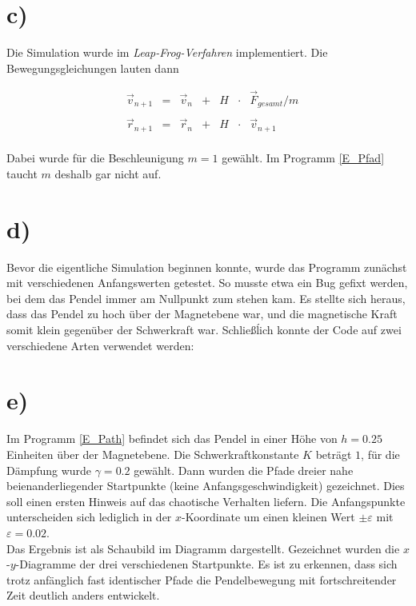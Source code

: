 \section*{c)}
Die Simulation wurde im \textit{Leap-Frog-Verfahren} implementiert. Die Bewegungsgleichungen lauten dann

\begin{align}
&\vec{v}_{n+1} &= &\vec{v}_n &+ &H &\cdot &\vec{F}_{gesamt} / m \\\\
&\vec{r}_{n+1} &= &\vec{r}_n &+ &H &\cdot &\vec{v}_{n+1}
\end{align}
\\
Dabei wurde für die Beschleunigung $m=1$ gewählt. Im Programm \ref{E_Pfad} taucht $m$ deshalb gar nicht auf.

\section*{d)}
Bevor die eigentliche Simulation beginnen konnte, wurde das Programm zunächst mit verschiedenen Anfangswerten getestet. So musste etwa ein Bug gefixt werden, bei dem das Pendel immer am Nullpunkt zum stehen kam. Es stellte sich heraus, dass das Pendel zu hoch über der Magnetebene war, und die magnetische Kraft somit klein gegenüber der Schwerkraft war. Schließĺich konnte der Code auf zwei verschiedene Arten verwendet werden:

\section{e)}
Im Programm \ref{E_Path} befindet sich das Pendel in einer Höhe von $h=0.25$ Einheiten über der Magnetebene. Die Schwerkraftkonstante $K$ beträgt $1$, für die Dämpfung wurde $\gamma = 0.2$ gewählt. Dann wurden die Pfade dreier nahe beienanderliegender Startpunkte (keine Anfangsgeschwindigkeit) gezeichnet. Dies soll einen ersten Hinweis auf das chaotische Verhalten liefern. Die Anfangspunkte unterscheiden sich lediglich in der $x$-Koordinate um einen kleinen Wert $\pm \varepsilon$ mit $\varepsilon = 0.02$.\\
Das Ergebnis ist als Schaubild im Diagramm \label{fig:xy} dargestellt. Gezeichnet wurden die $x$-$y$-Diagramme der drei verschiedenen Startpunkte. Es ist zu erkennen, dass sich trotz anfänglich fast identischer Pfade die Pendelbewegung mit fortschreitender Zeit deutlich anders entwickelt.


